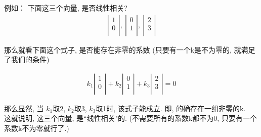 \documentclass[UTF8]{ctexart}
\begin{document}
\begin{myEnvSample}
	例如： 下面这三个向量, 是否线性相关?
	\begin{align}
		\left| \begin{array}{l}
			       1 \\
			       0 \\
		       \end{array} \right|,\ \left| \begin{array}{l}
			                                    0 \\
			                                    1 \\
		                                    \end{array} \right|,\ \left| \begin{array}{l}
			                                                                 2 \\
			                                                                 3 \\
		                                                                 \end{array} \right|
	\end{align}

	那么就看下面这个式子, 是否能存在非零的系数 (只要有一个k是不为零的, 就满足了我们的条件)

	\begin{align}
		k_1\left| \begin{array}{l}
			          1 \\
			          0 \\
		          \end{array} \right|+k_2\left| \begin{array}{l}
			                                        0 \\
			                                        1 \\
		                                        \end{array} \right|+k_3\left| \begin{array}{l}
			                                                                      2 \\
			                                                                      3 \\
		                                                                      \end{array} \right|=0
	\end{align}

	那么显然, 当 $ k_1$取2, $k_2$取3, $k_3$取1时, 该式子能成立. 即, 的确存在一组非零的k. \\
	这就说明, 这三个向量, 是``线性相关"的. (不需要所有的系数k都不为0, 只要有一个系数k不为零就行了.)
\end{myEnvSample}
\end{document}
